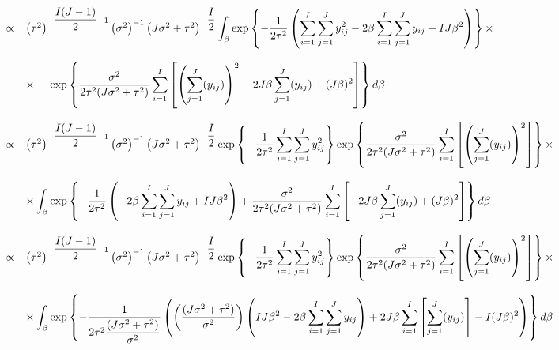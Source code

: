 \documentclass{article}
\begin{document}
\begin{equation*}
\begin{array}{lcl ll }

& \propto & \left(\tau^2\right)^{-\dfrac{I(J-1)}{2} -1} \left(\sigma^2\right)^{-1} \left(J\sigma^2 + \tau^2\right)^{-\dfrac{I}{2}} \displaystyle\int_{\beta} \mbox{exp}\left\{ - \dfrac{1}{2\tau^2}\left( \displaystyle\sum_{i=1}^{I}\sum_{j=1}^{J} y_{ij}^2 - 2\beta\displaystyle\sum_{i=1}^{I}\sum_{j=1}^{J}y_{ij} + IJ\beta^2 \right) \right\} \times \\ \\

& & \times \hspace{0.5cm} \mbox{exp}\left\{ \dfrac{\sigma^2}{2\tau^2(J\sigma^2 + \tau^2)}\displaystyle\sum_{i=1}^{I}\left[\left(\sum_{j=1}^{J} (y_{ij})\right)^2 - 2J\beta\sum_{j=1}^{J} (y_{ij}) + (J\beta)^2 \right] \right\}d\beta\\\\


& \propto & \left(\tau^2\right)^{-\dfrac{I(J-1)}{2} -1} \left(\sigma^2\right)^{-1} \left(J\sigma^2 + \tau^2\right)^{-\dfrac{I}{2}} \mbox{exp}\left\{ - \dfrac{1}{2\tau^2}\displaystyle\sum_{i=1}^{I}\sum_{j=1}^{J} y_{ij}^2 \right\} \mbox{exp}\left\{ \dfrac{\sigma^2}{2\tau^2(J\sigma^2 + \tau^2)}\displaystyle\sum_{i=1}^{I}\left[\left(\sum_{j=1}^{J} (y_{ij})\right)^2 \right] \right\} \times \\ \\

& & \times
\displaystyle\int_{\beta} \mbox{exp}\left\{ - \dfrac{1}{2\tau^2}\left( - 2\beta\displaystyle\sum_{i=1}^{I}\sum_{j=1}^{J}y_{ij} + IJ\beta^2 \right) + \dfrac{\sigma^2}{2\tau^2(J\sigma^2 + \tau^2)}\displaystyle\sum_{i=1}^{I}\left[ - 2J\beta\sum_{j=1}^{J} (y_{ij}) + (J\beta)^2 \right]  \right\} d\beta\\\\

& \propto & \left(\tau^2\right)^{-\dfrac{I(J-1)}{2} -1} \left(\sigma^2\right)^{-1} \left(J\sigma^2 + \tau^2\right)^{-\dfrac{I}{2}} \mbox{exp}\left\{ - \dfrac{1}{2\tau^2}\displaystyle\sum_{i=1}^{I}\sum_{j=1}^{J} y_{ij}^2 \right\} \mbox{exp}\left\{ \dfrac{\sigma^2}{2\tau^2(J\sigma^2 + \tau^2)}\displaystyle\sum_{i=1}^{I}\left[\left(\sum_{j=1}^{J} (y_{ij})\right)^2 \right] \right\} \times \\ \\

& & \times
\displaystyle\int_{\beta} \mbox{exp}\left\{ - \dfrac{1}{2\tau^2\dfrac{(J\sigma^2 + \tau^2)}{\sigma^2}}\left(\left( \dfrac{(J\sigma^2 + \tau^2)}{\sigma^2} \right) \left(  IJ\beta^2 - 2\beta\displaystyle\sum_{i=1}^{I}\sum_{j=1}^{J}y_{ij} \right) + 2J\beta\displaystyle\sum_{i=1}^{I}\left[\sum_{j=1}^{J} (y_{ij}) \right]-I(J\beta)^2 \right) \right\} d\beta\\\\


\end{array}
\end{equation*}
\end{document}

